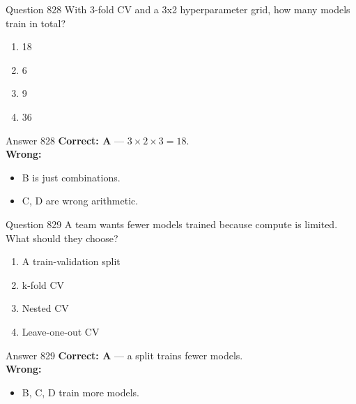 \documentclass[aspectratio=169,11pt]{beamer}
\begin{document}
	\begin{frame}{Question 828}
		With 3-fold CV and a 3x2 hyperparameter grid, how many models train in total?
		\begin{enumerate}[label=\Alph*.]
			\item 18
			\item 6
			\item 9
			\item 36
		\end{enumerate}
	\end{frame}
	\begin{frame}{Answer 828}
		\textbf{Correct: A} --- $3 \times 2 \times 3 = 18$.\\
		\vspace{0.5em}
		\textbf{Wrong:}
		\begin{itemize}
			\item B is just combinations.
			\item C, D are wrong arithmetic.
		\end{itemize}
	\end{frame}
	
	\begin{frame}{Question 829}
		A team wants fewer models trained because compute is limited. What should they choose?
		\begin{enumerate}[label=\Alph*.]
			\item A train-validation split
			\item k-fold CV
			\item Nested CV
			\item Leave-one-out CV
		\end{enumerate}
	\end{frame}
	\begin{frame}{Answer 829}
		\textbf{Correct: A} --- a split trains fewer models.\\
		\vspace{0.5em}
		\textbf{Wrong:}
		\begin{itemize}
			\item B, C, D train more models.
		\end{itemize}
	\end{frame}
	
\end{document}
